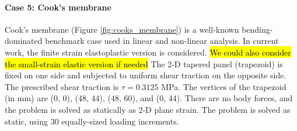 \documentclass[sn-mathphys,Numbered]{sn-jnl}%
\begin{document}
\paragraph{Case 5: Cook's membrane}
Cook's membrane (Figure \ref{fig:cooks_membrane}) is a well-known bending-dominated benchmark case used in linear and non-linear analysis.
In current work, the finite strain elastoplastic version \citep{Simo1992} is considered. \hl{We could also consider the small-strain elastic version if needed}
The 2-D tapered panel (trapezoid) is fixed on one side and subjected to uniform shear traction on the opposite side.
The prescribed shear traction is $\tau = 0.3125$ MPa.
The vertices of the trapezoid (in mm) are (0, 0), (48, 44), (48, 60),  and (0, 44).
There are no body forces, and the problem is solved as statically as 2-D plane strain.
The problem is solved as static, using 30 equally-sized loading increments.
\end{document}
